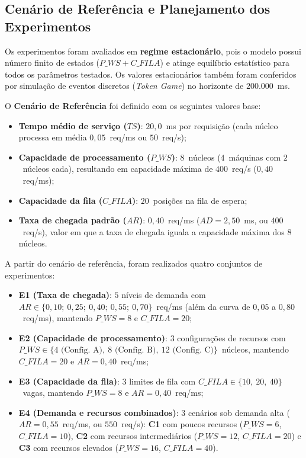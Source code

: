 \documentclass[conference,10pt]{IEEEtran}
\begin{document}
\subsection{Cenário de Referência e Planejamento dos Experimentos}
Os experimentos foram avaliados em \textbf{regime estacionário}, pois o modelo possui número finito de estados ($P\_WS + C\_FILA$) e atinge equilíbrio estatístico para todos os parâmetros testados. Os valores estacionários também foram conferidos por simulação de eventos discretos (\textit{Token Game}) no horizonte de $200.000$~ms.

O \textbf{Cenário de Referência} foi definido com os seguintes valores base:
\begin{itemize}
    \item \textbf{Tempo médio de serviço ($TS$)}: $20,0$~ms por requisição (cada núcleo processa em média $0,05$~req/ms ou $50$~req/s);
    \item \textbf{Capacidade de processamento ($P\_WS$)}: $8$~núcleos ($4$~máquinas com $2$~núcleos cada), resultando em capacidade máxima de $400$~req/s ($0,40$~req/ms);
    \item \textbf{Capacidade da fila ($C\_FILA$)}: $20$~posições na fila de espera;
    \item \textbf{Taxa de chegada padrão ($AR$)}: $0,40$~req/ms ($AD = 2,50$~ms, ou $400$~req/s), valor em que a taxa de chegada iguala a capacidade máxima dos 8 núcleos.
\end{itemize}

A partir do cenário de referência, foram realizados quatro conjuntos de experimentos:
\begin{itemize}
    \item \textbf{E1 (Taxa de chegada)}: $5$ níveis de demanda com $AR \in \{0,10;\ 0,25;\ 0,40;\ 0,55;\ 0,70\}$~req/ms (além da curva de $0,05$ a $0,80$~req/ms), mantendo $P\_WS = 8$ e $C\_FILA = 20$;
    \item \textbf{E2 (Capacidade de processamento)}: $3$ configurações de recursos com $P\_WS \in \{4\text{ (Config. A)},\ 8\text{ (Config. B)},\ 12\text{ (Config. C)}\}$~núcleos, mantendo $C\_FILA = 20$ e $AR = 0,40$~req/ms;
    \item \textbf{E3 (Capacidade da fila)}: $3$ limites de fila com $C\_FILA \in \{10,\ 20,\ 40\}$~vagas, mantendo $P\_WS = 8$ e $AR = 0,40$~req/ms;
    \item \textbf{E4 (Demanda e recursos combinados)}: $3$ cenários sob demanda alta ($AR = 0,55$~req/ms, ou $550$~req/s): \textbf{C1} com poucos recursos ($P\_WS = 6$, $C\_FILA = 10$), \textbf{C2} com recursos intermediários ($P\_WS = 12$, $C\_FILA = 20$) e \textbf{C3} com recursos elevados ($P\_WS = 16$, $C\_FILA = 40$).
\end{itemize}
\end{document}
